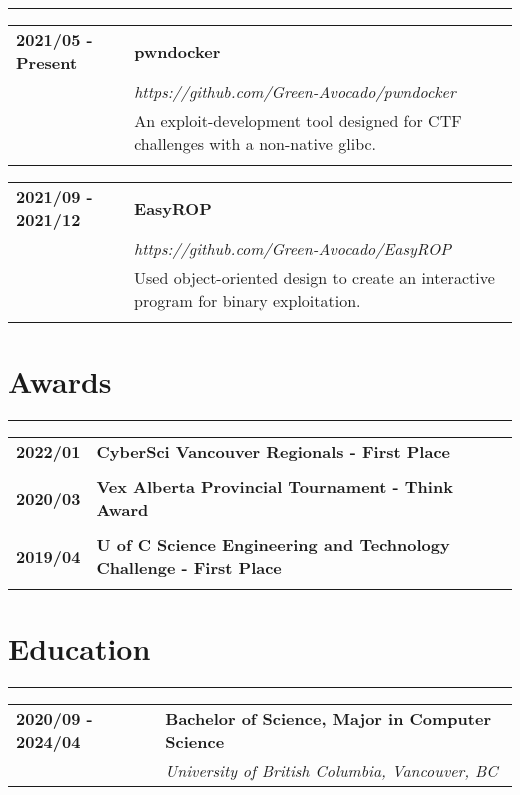 \documentclass[letterpaper]{article}
\newcommand{\horizontalLine}{%
    {\color{red}
    \rule{\textwidth}{1pt}
    \vspace{-1ex}}
}
\begin{document}
        \horizontalLine

        \begin{tabular}{p{} p{}} 
            \textbf{2021/05 - Present} & \large\textbf{pwndocker} \\
            & \emph{https://github.com/Green-Avocado/pwndocker} \\
            & An exploit-development tool designed for CTF challenges with a non-native glibc. \\
            \\
        \end{tabular}

        \begin{tabular}{p{} p{}} 
            \textbf{2021/09 - 2021/12} & \large\textbf{EasyROP} \\
            & \emph{https://github.com/Green-Avocado/EasyROP} \\
            & Used object-oriented design to create an interactive program for binary exploitation. \\
            \\
        \end{tabular}

    \section*{Awards}

        \horizontalLine

        \begin{tabular}{p{} p{}} 
            \textbf{2022/01} & \large\textbf{CyberSci Vancouver Regionals - First Place} \\
            \\
            \textbf{2020/03} & \large\textbf{Vex Alberta Provincial Tournament - Think Award} \\
            \\
            \textbf{2019/04} & \large\textbf{U of C Science Engineering and Technology Challenge - First Place} \\
            \\
        \end{tabular}

    \section*{Education}

        \horizontalLine

        \begin{tabular}{p{} p{}} 
            \textbf{2020/09 - 2024/04} & \large\textbf{Bachelor of Science, Major in Computer Science} \\
            & \emph{University of British Columbia, Vancouver, BC} \\
        \end{tabular}
\end{document}

